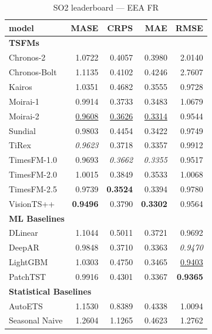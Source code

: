\begin{table}[H]
\caption{SO2 leaderboard --- EEA FR}
\centering
\begin{small}
\begin{tabular}{lrrrr}
\toprule
model & MASE & CRPS & MAE & RMSE \\
\midrule
\multicolumn{5}{l}{\textbf{TSFMs}} \\
Chronos-2 & 1.0722 & 0.4057 & 0.3980 & 2.0140 \\
Chronos-Bolt & 1.1135 & 0.4102 & 0.4246 & 2.7607 \\
Kairos & 1.0351 & 0.4682 & 0.3555 & 0.9728 \\
Moirai-1 & 0.9914 & 0.3733 & 0.3483 & 1.0679 \\
Moirai-2 & \underline{0.9608} & \underline{0.3626} & \underline{0.3314} & 0.9544 \\
Sundial & 0.9803 & 0.4454 & 0.3422 & 0.9749 \\
TiRex & \textit{0.9623} & 0.3718 & 0.3357 & 0.9912 \\
TimesFM-1.0 & 0.9693 & \textit{0.3662} & \textit{0.3355} & 0.9517 \\
TimesFM-2.0 & 1.0015 & 0.3849 & 0.3533 & 1.0068 \\
TimesFM-2.5 & 0.9739 & \textbf{0.3524} & 0.3394 & 0.9780 \\
VisionTS++ & \textbf{0.9496} & 0.3790 & \textbf{0.3302} & 0.9564 \\
\midrule
\multicolumn{5}{l}{\textbf{ML Baselines}} \\
DLinear & 1.1044 & 0.5011 & 0.3721 & 0.9692 \\
DeepAR & 0.9848 & 0.3710 & 0.3363 & \textit{0.9470} \\
LightGBM & 1.0303 & 0.4750 & 0.3465 & \underline{0.9403} \\
PatchTST & 0.9916 & 0.4301 & 0.3367 & \textbf{0.9365} \\
\midrule
\multicolumn{5}{l}{\textbf{Statistical Baselines}} \\
AutoETS & 1.1530 & 0.8389 & 0.4338 & 1.0094 \\
Seasonal Naive & 1.2604 & 1.1265 & 0.4623 & 1.2762 \\
\bottomrule
\end{tabular}
\end{small}
\end{table}